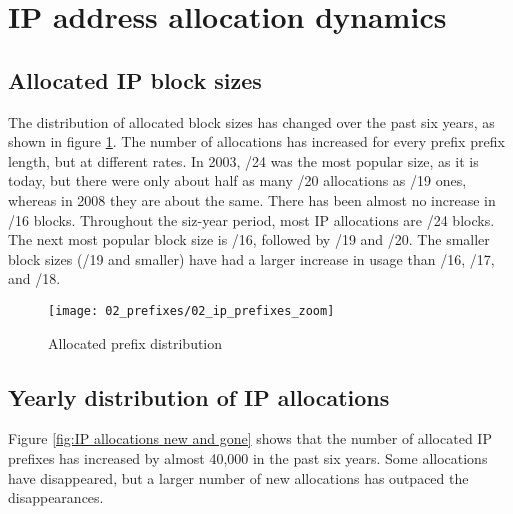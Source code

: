 \section{IP address allocation dynamics}
\label{sec:allocations}

\subsection{}

\subsection{Allocated IP block sizes}

The distribution of allocated block sizes has changed over the past six years,
as shown in figure \ref{fig:IP allocations}. The number of allocations has
increased for every prefix prefix length, but at different rates. In 2003, /24
was the most popular size, as it is today, but there were only about half as
many /20 allocations as /19 ones, whereas in 2008 they are about the same.
There has been almost no increase in /16 blocks. Throughout the siz-year
period, most IP allocations are /24 blocks. The next most popular block size
is /16, followed by /19 and /20. The smaller block sizes (/19 and smaller)
have had a larger increase in usage than /16, /17, and /18.

\begin{figure}[htbp]
 	\centering
 		\texttt{[image: 02\_prefixes/02\_ip\_prefixes\_zoom]}
	\caption{Allocated prefix distribution}
 	\label{fig:IP allocations}
\end{figure}

\subsection{Yearly distribution of IP allocations}


Figure \ref{fig:IP allocations new and gone} shows that the number of
allocated IP prefixes has increased by almost 40,000 in the past six years.
Some allocations have disappeared, but a larger number of new allocations has
outpaced the disappearances.

